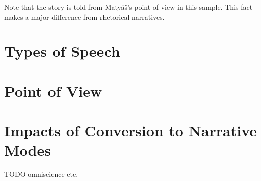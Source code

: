 Note that the story is told from Matyáš's point of view in this sample. This fact makes a major difference from rhetorical narratives.

\section{Types of Speech} \label{sec:speeches}
\section{Point of View}

\section{Impacts of Conversion to Narrative Modes}


TODO omniscience etc. 
